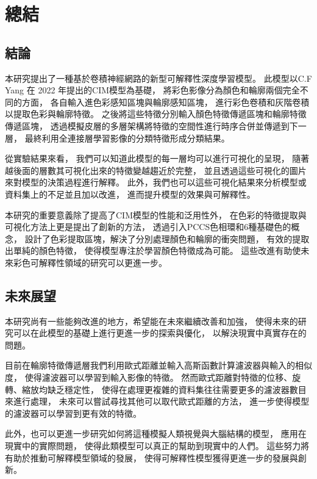 \documentclass[class=NCU_thesis, crop=false]{standalone}
\begin{document}
\chapter{總結}
\section{結論}

本研究提出了一種基於卷積神經網路的新型可解釋性深度學習模型。
此模型以C.F Yang 在 2022 年提出的CIM模型\cite{YangCNNInterpretable}為基礎，
將彩色影像分為顏色和輪廓兩個完全不同的方面，
各自輸入進色彩感知區塊與輪廓感知區塊，
進行彩色卷積和灰階卷積以提取色彩與輪廓特徵。
之後將這些特徵分別輸入顏色特徵傳遞區塊和輪廓特徵傳遞區塊，
透過模擬皮層的多層架構將特徵的空間性進行時序合併並傳遞到下一層，
最終利用全連接層學習影像的分類特徵形成分類結果。

從實驗結果來看，
我們可以知道此模型的每一層均可以進行可視化的呈現，
隨著越後面的層數其可視化出來的特徵變越趨近於完整，
並且透過這些可視化的圖片來對模型的決策過程進行解釋。
此外，我們也可以這些可視化結果來分析模型或資料集上的不足並且加以改進，
進而提升模型的效果與可解釋性。

本研究的重要意義除了提高了CIM模型的性能和泛用性外，
在色彩的特徵提取與可視化方法上更是提出了創新的方法，
透過引入PCCS色相環和6種基礎色的概念，
設計了色彩提取區塊，解決了分別處理顏色和輪廓的衝突問題，
有效的提取出單純的顏色特徵，
使得模型專注於學習顏色特徵成為可能。
這些改進有助使未來彩色可解釋性領域的研究可以更進一步。

\section{未來展望}
本研究尚有一些能夠改進的地方，希望能在未來繼續改善和加強，
使得未來的研究可以在此模型的基礎上進行更進一步的探索與優化，
以解決現實中真實存在的問題。

目前在輪廓特徵傳遞層我們利用歐式距離並輸入高斯函數計算濾波器與輸入的相似度，
使得濾波器可以學習到輸入影像的特徵。
然而歐式距離對特徵的位移、旋轉、縮放均缺乏穩定性，
使得在處理更複雜的資料集往往需要更多的濾波器數目來進行處理，
未來可以嘗試尋找其他可以取代歐式距離的方法，
進一步使得模型的濾波器可以學習到更有效的特徵。

此外，也可以更進一步研究如何將這種模擬人類視覺與大腦結構的模型，
應用在現實中的實際問題，
使得此類模型可以真正的幫助到現實中的人們。
這些努力將有助於推動可解釋模型領域的發展，
使得可解釋性模型獲得更進一步的發展與創新。
\end{document}
